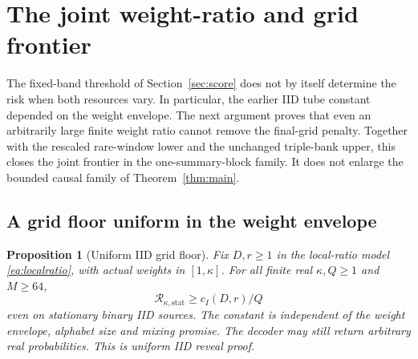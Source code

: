 \documentclass[11pt,letterpaper]{article}
\newtheorem{proposition}[theorem]{Proposition}
\theoremstyle{definition}\newtheorem{definition}[theorem]{Definition}
\theoremstyle{remark}\newtheorem{remark}[theorem]{Remark}
\newcommand{\Risk}{\mathcal{R}}
\begin{document}
\section{The joint weight-ratio and grid frontier}\label{sec:joint}
The fixed-band threshold of Section~\ref{sec:score} does not by itself determine the risk when both resources vary. In particular, the earlier IID tube constant depended on the weight envelope. The next argument proves that even an arbitrarily large finite weight ratio cannot remove the final-grid penalty. Together with the rescaled rare-window lower and the unchanged triple-bank upper, this closes the joint frontier in the one-summary-block family. It does not enlarge the bounded causal family of Theorem~\ref{thm:main}.

\subsection{A grid floor uniform in the weight envelope}
\begin{proposition}[Uniform IID grid floor]\label{prop:iiduniform}
Fix $D,r\ge1$ in the local-ratio model \eqref{eq:localratio}, with actual weights in $[1,\kappa]$. For all finite real $\kappa,Q\ge1$ and $M\ge64$,
\[
 \Risk_{\kappa,\mathrm{stat}}\ge c_I(D,r)/Q
\]
even on stationary binary IID sources. The constant is independent of the weight envelope, alphabet size and mixing promise. The decoder may still return arbitrary real probabilities. This is uniform IID reveal proof.
\end{proposition}
\end{document}
